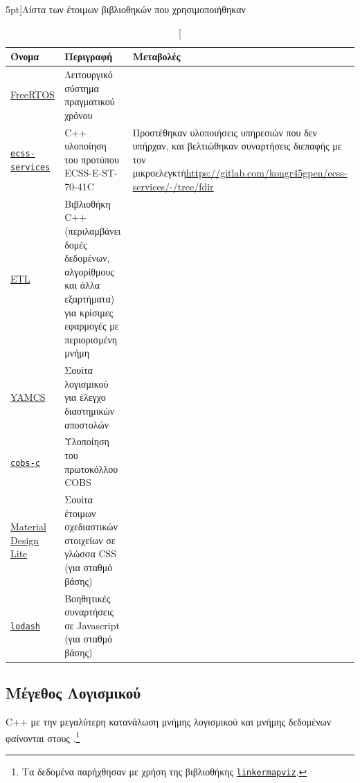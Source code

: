 \documentclass[a4paper,nobib]{tufte-book}
\begin{document}
\begin{table}[h]
	\centering
	\vspace{2em}
	\caption[][5pt]{Λίστα των έτοιμων βιβλιοθηκών που χρησιμοποιήθηκαν}
	\renewcommand{\arraystretch}{1.5}
	\label{tab:old_software}
	\begin{tabularx}{\textwidth}{@{}lp{6cm}X@{}}
		\toprule
		Όνομα & Περιγραφή & Μεταβολές \\ \midrule
		\href{https://www.freertos.org/}{FreeRTOS} & Λειτουργικό σύστημα πραγματικού χρόνου & \\
		\href{https://gitlab.com/acubesat/obc/ecss-services}{\texttt{ecss-services}} & C++ υλοποίηση του προτύπου ECSS-E-ST-70-41C %
		& \small
		Προστέθηκαν υλοποιήσεις υπηρεσιών που δεν υπήρχαν, και βελτιώθηκαν συναρτήσεις διεπαφής με τον μικροελεγκτή\newline\small\url{https://gitlab.com/kongr45gpen/ecss-services/-/tree/fdir}
		 \\
		 \href{https://www.etlcpp.com/}{\acs{ETL}}  & Βιβλιοθήκη C++ (περιλαμβάνει δομές δεδομένων, αλγορίθμους και άλλα εξαρτήματα) για κρίσιμες εφαρμογές με περιορισμένη μνήμη &
		 \\
 		\href{https://github.com/yamcs/yamcs}{\acs{YAMCS}}  & Σουίτα λογισμικού για έλεγχο διαστημικών αποστολών& %
 		\\
		\href{https://github.com/cmcqueen/cobs-c}{\texttt{cobs-c}}  & Υλοποίηση του πρωτοκόλλου \ac{COBS} %
		 & \\
		 \href{https://getmdl.io/}{Material Design Lite}  & Σουίτα έτοιμων σχεδιαστικών στοιχείων σε γλώσσα CSS (για σταθμό βάσης)
		 & \\
		 \href{https://lodash.com/}{\texttt{lodash}}  & Βοηθητικές συναρτήσεις σε Javascript (για σταθμό βάσης)
		 & \\
		\bottomrule
	\end{tabularx}
\end{table}

\FloatBarrier
\subsection{Μέγεθος Λογισμικού}
 C++ με την μεγαλύτερη κατανάλωση μνήμης λογισμικού και μνήμης δεδομένων φαίνονται στους .\footnote{Τα δεδομένα παρήχθησαν με χρήση της βιβλιοθήκης \href{https://github.com/PromyLOPh/linkermapviz}{\texttt{linkermapviz}}.}
\end{document}
